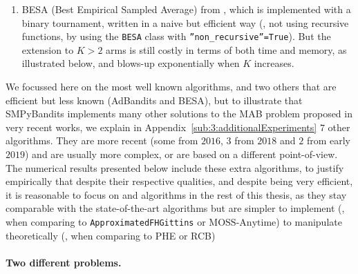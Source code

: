 \begin{enumerate}
    \item
    BESA (Best Empirical Sampled Average) from \cite{Baransi2014},
    which is implemented with a binary tournament, written in a naive but efficient way
    (\ie, not using recursive functions, by using the \texttt{BESA} class with \texttt{''non\_recursive''=True}).
    But the extension to $K>2$ arms is still costly in terms of both time and memory, as illustrated below, and blows-up exponentially  when $K$ increases.
\end{enumerate}

We focussed here on the most well known algorithms, and two others that are efficient but less known (AdBandits and BESA),
but to illustrate that SMPyBandits implements many other solutions to the MAB problem proposed in very recent works, we explain in Appendix~\ref{sub:3:additionalExperiments} $7$ other algorithms.
They are more recent (some from $2016$, $3$ from $2018$ and $2$ from early $2019$) and are usually more complex, or are based on a different point-of-view.
The numerical results presented below include these extra algorithms, to justify empirically that despite their respective qualities, and despite being very efficient, it is reasonable to focus on \UCB{} and \klUCB{} algorithms in the rest of this thesis, as they stay comparable with the state-of-the-art algorithms but are simpler to implement (\eg, when comparing \UCB{} to \texttt{ApproximatedFHGittins} or $\mathrm{MOSS}$-$\mathrm{Anytime}$) to manipulate theoretically (\eg, when comparing \klUCB{} to PHE or RCB)


\paragraph{Two different problems.}


